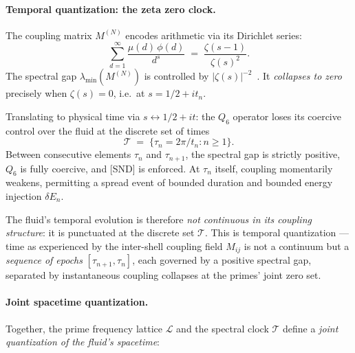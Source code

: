 \documentclass[11pt]{article}
\begin{document}
\paragraph{Temporal quantization: the zeta zero clock.}

The coupling matrix $M^{(N)}$ encodes arithmetic via its Dirichlet series:
\[
  \sum_{d=1}^\infty \frac{\mu(d)\,\phi(d)}{d^s}
  \;=\; \frac{\zeta(s-1)}{\zeta(s)^2}.
\]
The spectral gap $\lambda_{\min}(M^{(N)})$ is controlled by
$|\zeta(s)|^{-2}$~\cite{SimonsQ6RH2026}. It \emph{collapses to zero}
precisely when $\zeta(s) = 0$, i.e.\ at $s = 1/2 + it_n$.

Translating to physical time via $s \leftrightarrow 1/2 + it$:
the $Q_6$ operator loses its coercive control over the fluid at the
discrete set of times
\[
  \mathcal{T} \;=\; \bigl\{\tau_n = 2\pi/t_n : n \geq 1\bigr\}.
\]
Between consecutive elements $\tau_n$ and $\tau_{n+1}$, the spectral gap
is strictly positive, $Q_6$ is fully coercive, and [SND] is enforced.
At $\tau_n$ itself, coupling momentarily weakens, permitting a spread event
of bounded duration and bounded energy injection $\delta E_n$.

The fluid's temporal evolution is therefore \emph{not continuous in its
coupling structure}: it is punctuated at the discrete set $\mathcal{T}$.
This is temporal quantization --- time as experienced by the inter-shell
coupling field $M_{ij}$ is not a continuum but a \emph{sequence of epochs}
$[\tau_{n+1}, \tau_n]$, each governed by a positive spectral gap, separated
by instantaneous coupling collapses at the primes' joint zero set.

\paragraph{Joint spacetime quantization.}

Together, the prime frequency lattice $\mathcal{L}$ and the spectral clock
$\mathcal{T}$ define a \emph{joint quantization of the fluid's spacetime}:
\end{document}
